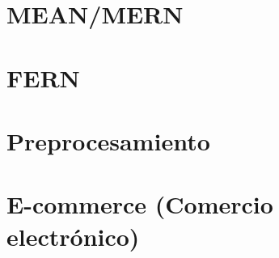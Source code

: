 \documentclass[12pt]{report}
\begin{document}
% 

\section{MEAN/MERN}


\newpage
\section{FERN}


\newpage
\section{Preprocesamiento}


\newpage
\section{E-commerce (Comercio electrónico)}

\end{document}
